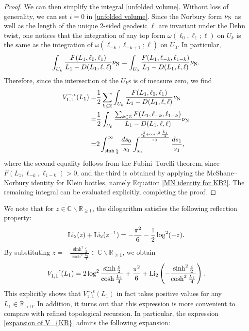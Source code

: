 \documentclass[12pt]{amsart}
\theoremstyle{plain}
\theoremstyle{definition}
\theoremstyle{remark}
\numberwithin{equation}{section}
\begin{document}
\begin{proof}
We can then simplify the integral \eqref{unfolded volume}. Without loss of generality, we can set $i=0$ in \eqref{unfolded volume}. Since the Norbury form $\nu_{{\rm N}}$ as well as the length of the unique 2-sided geodesic $\ell$ are invariant under the Dehn twist, one notices that the integration of any top form $\omega(\ell_0,\ell_1;\ell)$ on $U_k$ is the same as the integration of $\omega(\ell_{-k},\ell_{-k+1};\ell)$ on $U_0$. In particular,
\begin{equation*}
\int_{U_{k}}\frac{F(L_1,\ell_0,\ell_{1})}{L_1-D(L_1,\ell,\ell)}\nu_{{\rm N}}=\int_{U_{0}}\frac{F(L_1,\ell_{-k},\ell_{1-k})}{L_1-D(L_1,\ell,\ell)}\nu_{{\rm N}}.
\end{equation*}
Therefore, since the intersection of the $U_k$s is of measure zero, we find
\begin{align}
V_{1,1}^{-,\epsilon}(L_1)=&\frac12\sum_{k\in\mathbb{Z}}\int_{U_{k}}\frac{F(L_1,\ell_0,\ell_{1})}{L_1-D(L_1,\ell,\ell)}\nu_{{\rm N}}\nonumber\\
=&\frac12\int_{U_{0}}\frac{\sum_{k\in\mathbb{Z}}F(L_1,\ell_{-k},\ell_{1-k})}{L_1-D(L_1,\ell,\ell)}\nu_{{\rm N}}\nonumber\\
=&2\int_{\sinh\frac{\epsilon}{2}}^{\infty}\frac{ds_0}{s_0}\int_{s_0}^{\frac{s_0^2+\cosh^2\frac{L_1}{4}}{s_0}}\frac{ds_1}{s_1},\nonumber
\end{align}
where the second equality follows from the Fubini--Torelli theorem, since $F(L_1,\ell_{-k},\ell_{1-k})>0$, and the third is obtained by applying the McShane--Norbury identity for Klein bottles, namely Equation \eqref{MN identity for KB2}. The remaining integral can be evaluated explicitly, completing the proof.
\end{proof}

We note that for $z\in\mathbb{C}\backslash\mathbb{R}_{\geq1}$, the dilogarithm satisfies the following reflection property:
\begin{equation}
    {\rm Li}_2(z)+ {\rm Li_2}(z^{-1})=-\frac{\pi^2}{6}-\frac12\log^2(-z).\label{dilog identity}
\end{equation}
By substituting $z = -\frac{\sinh^2\frac{\epsilon}{2}}{\cosh^2\frac{L_1}{4}}\in\mathbb{C}\backslash\mathbb{R}_{\geq1}$, we obtain
\begin{equation}
  V_{1,1}^{-,\epsilon}(L_1)=  2\log^2\frac{\sinh\frac{\epsilon}{2}}{\cosh\frac{L_1}{4}}+\frac{\pi^2}{6}+{\rm Li}_2\left(-\frac{\sinh^2\frac{\epsilon}{2}}{\cosh^2\frac{L_1}{4}}\right).\label{expansion of V_{KB}}
\end{equation}
This explicitly shows that $V_{1,1}^{-,\epsilon}(L_1)$ in fact takes positive values for any $L_1\in\mathbb{R}_{>0}$. In addition, it turns out that this expression is more convenient to compare with refined topological recursion. In particular, the expression \eqref{expansion of V_{KB}} admits the following expansion:
\end{document}
